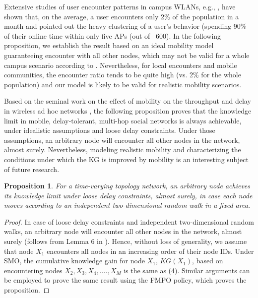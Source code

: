 \documentclass[12pt,epsf]{article}
\newtheorem{prop}{Proposition}
\theoremstyle{definition}
\begin{document}
Extensive studies of user encounter patterns in campus WLANs, e.g., \cite{hsu,diot}, have shown that, on the average, a user encounters only 2\% of the population in a month and pointed out the heavy clustering of a user's behavior (spending 90\% of their online time within only five APs (out of ~600). In the following proposition, we establish the result based on an ideal mobility model guaranteeing encounter with all other nodes, which may not be valid
for a whole campus scenario according to \cite{hsu}. Nevertheless, for local encounters and mobile communities, the encounter ratio tends to be quite high (vs. 2\% for the whole population) 
and our model is likely to be valid for realistic mobility scenarios.

Based on the seminal work on the effect of mobility on the throughput and delay in wireless ad hoc networks \cite{elgamal}, the following proposition proves that the knowledge limit in mobile, delay-tolerant, multi-hop social networks is always achievable, under idealistic assumptions and loose delay constraints. Under those assumptions, an arbitrary node will encounter all other nodes in the network, almost surely.
Nevertheless, modeling realistic mobility and characterizing the conditions under which the KG is improved by mobility is an interesting subject of future research.
%
%
\vspace{-0.2 cm}
\begin{prop}
For a time-varying topology network, an arbitrary node achieves its knowledge limit under loose delay constraints, almost surely, in case each node moves according to an independent two-dimensional random walk in a fixed 
area.
\end{prop}
\vspace{-0.5 cm}
\begin{proof}
In case of loose delay constraints and independent two-dimensional random walks, an arbitrary node will encounter all other nodes in the network, almost surely (follows from Lemma 6 in \cite{elgamal}).
Hence, without loss of generality, we assume that node $X_1$ encounters all nodes in an increasing order of their node IDs. Under SMO, the cumulative knowledge gain for node $X_1$, $KG(X_1)$, based on encountering nodes $X_2, X_3, X_4,...., X_M$ is the same as (4).
Similar arguments can be employed to prove the same result using the FMPO policy, which proves the proposition.
%
\end{proof}
\end{document}
